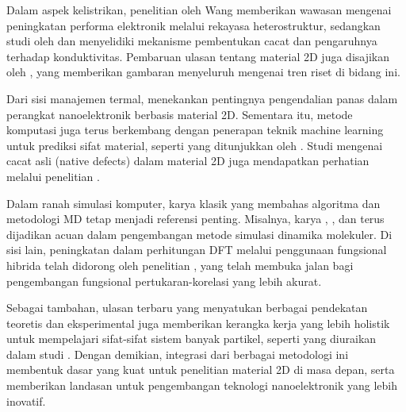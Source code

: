 Dalam aspek kelistrikan, penelitian oleh Wang  \citep{wang_electrical_2017} memberikan wawasan mengenai peningkatan performa elektronik melalui rekayasa heterostruktur, sedangkan studi oleh \citep{munro_improved_2020} dan \citep{huang_defect_2012} menyelidiki mekanisme pembentukan cacat dan pengaruhnya terhadap konduktivitas. Pembaruan ulasan tentang material 2D juga disajikan oleh \citep{bhimanapati_2d_2016}, yang memberikan gambaran menyeluruh mengenai tren riset di bidang ini.

Dari sisi manajemen termal, \citep{khan_thermal_2017} menekankan pentingnya pengendalian panas dalam perangkat nanoelektronik berbasis material 2D. Sementara itu, metode komputasi juga terus berkembang dengan penerapan teknik machine learning untuk prediksi sifat material, seperti yang ditunjukkan oleh \citep{zheng_machine_nodate}. Studi mengenai cacat asli (native defects) dalam material 2D juga mendapatkan perhatian melalui penelitian \citep{weston_native_2018}.

Dalam ranah simulasi komputer, karya klasik yang membahas algoritma dan metodologi MD tetap menjadi referensi penting. Misalnya, karya \citep{swope_computer_1982}, \citep{rapaport_art_2004}, dan \citep{allen_computer_1989} terus dijadikan acuan dalam pengembangan metode simulasi dinamika molekuler. Di sisi lain, peningkatan dalam perhitungan DFT melalui penggunaan fungsional hibrida telah didorong oleh penelitian \citep{Becke1993}, yang telah membuka jalan bagi pengembangan fungsional pertukaran-korelasi yang lebih akurat.

Sebagai tambahan, ulasan terbaru yang menyatukan berbagai pendekatan teoretis dan eksperimental juga memberikan kerangka kerja yang lebih holistik untuk mempelajari sifat-sifat sistem banyak partikel, seperti yang diuraikan dalam studi \citep{doi:10.1021/acs.jpca.1c09648}. Dengan demikian, integrasi dari berbagai metodologi ini membentuk dasar yang kuat untuk penelitian material 2D di masa depan, serta memberikan landasan untuk pengembangan teknologi nanoelektronik yang lebih inovatif.

